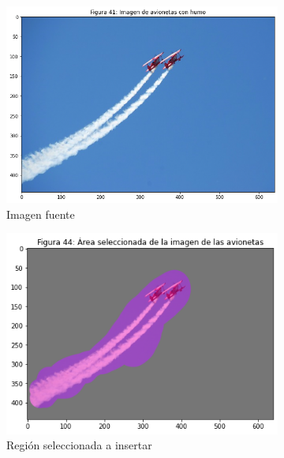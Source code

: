 \documentclass[11pt,twoside,titlepage,a4paper]{article}
\numberwithin{equation}{section} %
\theoremstyle{usual}
\begin{document}
\begin{figure}[h]
    \centering
    \begin{subfigure}[t]{.45\textwidth}
        \centering
        \includegraphics[width=\textwidth]{imagenes/PoissonImageEditing_cell_56_output_0.png}
        \caption{Imagen fuente}
    \end{subfigure}
    \begin{subfigure}[t]{.45\textwidth}
        \centering
        \includegraphics[width=\textwidth]{imagenes/PoissonImageEditing_cell_56_output_3.png}
        \caption{Región seleccionada a insertar}
    \end{subfigure}
    \begin{subfigure}[t]{.45\textwidth}
        \centering

\end{subfigure}
\end{figure}
\end{document}
